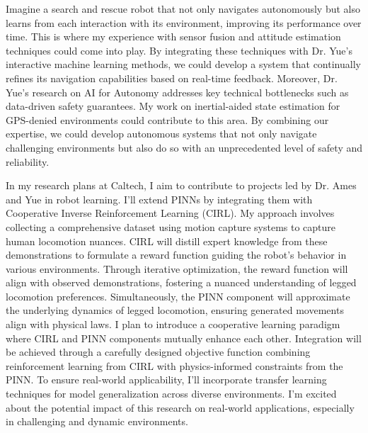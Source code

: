 \documentclass[a4,20pt]{article}
\begin{document}
\begin{large}
Imagine a search and rescue robot that not only navigates autonomously but also learns from each interaction with its environment, improving its performance over time. This is where my experience with sensor fusion and attitude estimation techniques could come into play. By integrating these techniques with Dr. Yue’s interactive machine learning methods, we could develop a system that continually refines its navigation capabilities based on real-time feedback. Moreover, Dr. Yue’s research on AI for Autonomy addresses key technical bottlenecks such as data-driven safety guarantees. My work on inertial-aided state estimation for GPS-denied environments could contribute to this area. By combining our expertise, we could develop autonomous systems that not only navigate challenging environments but also do so with an unprecedented level of safety and reliability.


In my research plans at Caltech, I aim to contribute to projects led by Dr. Ames and Yue in robot learning. I'll extend PINNs by integrating them with Cooperative Inverse Reinforcement Learning (CIRL). My approach involves collecting a comprehensive dataset using motion capture systems to capture human locomotion nuances. CIRL will distill expert knowledge from these demonstrations to formulate a reward function guiding the robot's behavior in various environments. Through iterative optimization, the reward function will align with observed demonstrations, fostering a nuanced understanding of legged locomotion preferences. Simultaneously, the PINN component will approximate the underlying dynamics of legged locomotion, ensuring generated movements align with physical laws. I plan to introduce a cooperative learning paradigm where CIRL and PINN components mutually enhance each other. Integration will be achieved through a carefully designed objective function combining reinforcement learning from CIRL with physics-informed constraints from the PINN. To ensure real-world applicability, I'll incorporate transfer learning techniques for model generalization across diverse environments. I'm excited about the potential impact of this research on real-world applications, especially in challenging and dynamic environments. 


\end{large}
\end{document}
